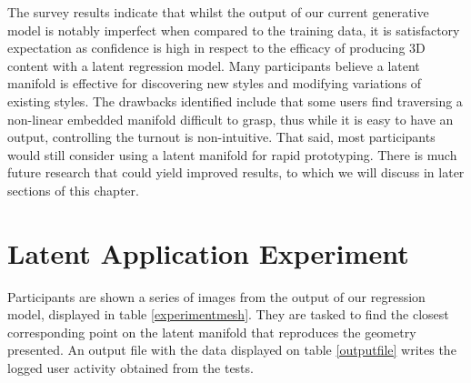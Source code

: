 \documentclass[ %
author={Dillon Keith Diep},
supervisor={Dr. Carl Henrik Ek},
degree={MEng},
title={ART-CG Hair:},
subtitle={Assisted Real-time Content Generation of Stylised Virtual Hair},
type={Research},
year={2017} ]{dissertation}
\begin{document}
The survey results indicate that whilst the output of our current generative model is notably imperfect when compared to the training data, it is satisfactory expectation as confidence is high in respect to the efficacy of producing 3D content with a latent regression model. Many participants believe a latent manifold is effective for discovering new styles and modifying variations of existing styles. The drawbacks identified include that some users find traversing a non-linear embedded manifold difficult to grasp, thus while it is easy to have an output, controlling the turnout is non-intuitive. That said, most participants would still consider using a latent manifold for rapid prototyping. There is much future research that could yield improved results, to which we will discuss in later sections of this chapter.

\section{Latent Application Experiment}
Participants are shown a series of images from the output of our regression model, displayed in table \ref{experimentmesh}. They are tasked to find the closest corresponding point on the latent manifold that reproduces the geometry presented. An output file with the data displayed on table \ref{outputfile} writes the logged user activity obtained from the tests.
\end{document}
